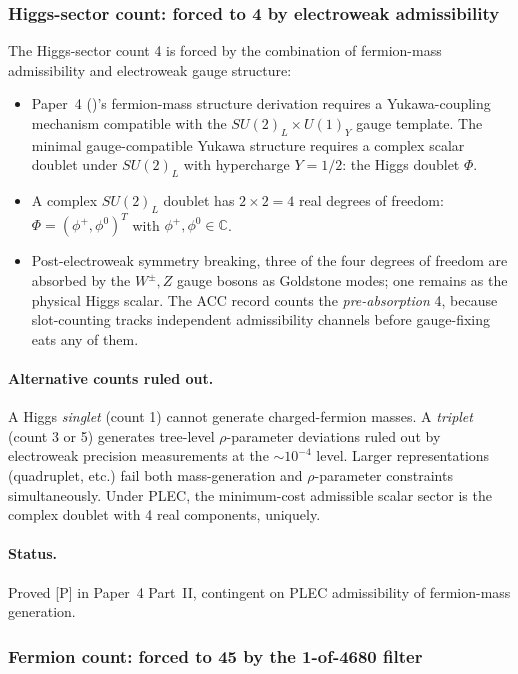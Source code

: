 \documentclass[11pt]{article}
\theoremstyle{plain}
\theoremstyle{definition}
\theoremstyle{remark}
\newcommand{\paperref}[2]{Paper~#1 (\emph{#2})}
\begin{document}
\subsubsection{Higgs-sector count: forced to 4 by electroweak admissibility}\label{supp:M1b}

The Higgs-sector count 4 is forced by the combination of fermion-mass admissibility and electroweak gauge structure:
\begin{itemize}[leftmargin=2em,itemsep=3pt]
  \item[($H_1$)] \paperref{4}{}'s fermion-mass structure derivation requires a Yukawa-coupling mechanism compatible with the $SU(2)_L \times U(1)_Y$ gauge template.  The minimal gauge-compatible Yukawa structure requires a complex scalar doublet under $SU(2)_L$ with hypercharge $Y = 1/2$: the Higgs doublet $\Phi$.
  \item[($H_2$)] A complex $SU(2)_L$ doublet has $2 \times 2 = 4$ real degrees of freedom: $\Phi = (\phi^+, \phi^0)^T$ with $\phi^+, \phi^0 \in \mathbb{C}$.
  \item[($H_3$)] Post-electroweak symmetry breaking, three of the four degrees of freedom are absorbed by the $W^\pm, Z$ gauge bosons as Goldstone modes; one remains as the physical Higgs scalar.  The ACC record counts the \emph{pre-absorption} 4, because slot-counting tracks independent admissibility channels before gauge-fixing eats any of them.
\end{itemize}

\paragraph{Alternative counts ruled out.}  A Higgs \emph{singlet} (count 1) cannot generate charged-fermion masses.  A \emph{triplet} (count 3 or 5) generates tree-level $\rho$-parameter deviations ruled out by electroweak precision measurements at the $\sim 10^{-4}$ level.  Larger representations (quadruplet, etc.) fail both mass-generation and $\rho$-parameter constraints simultaneously.  Under PLEC, the minimum-cost admissible scalar sector is the complex doublet with 4 real components, uniquely.

\paragraph{Status.}  Proved [P] in Paper~4 Part~II, contingent on PLEC admissibility of fermion-mass generation.

\subsubsection{Fermion count: forced to 45 by the 1-of-4680 filter}\label{supp:M1c}
\end{document}
